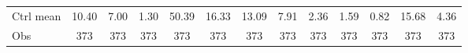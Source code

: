 {\begin{tabular}{l*{12}{c}}
Ctrl mean           &       10.40         &        7.00         &        1.30         &       50.39         &       16.33         &       13.09         &        7.91         &        2.36         &        1.59         &        0.82         &       15.68         &        4.36         \\
Obs                 &         373         &         373         &         373         &         373         &         373         &         373         &         373         &         373         &         373         &         373         &         373         &         373         \\
\bottomrule
\end{tabular}
}
